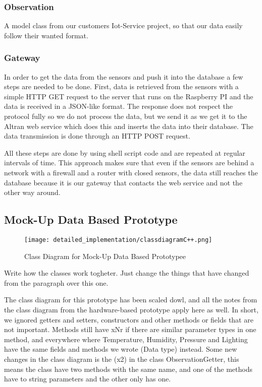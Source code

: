 \documentclass[../document]{subfiles}
\begin{document}
\subsubsection{Observation}
A model class from our customers Iot-Service project, so that our data easily follow their wanted format.

\subsubsection{Gateway}
In order to get the data from the sensors and push it into the database a few steps are needed to be done. First, data is retrieved from the sensors with a simple HTTP GET request to the server that runs on the Raspberry PI and the data is received in a JSON-like format. The response does not respect the protocol fully so we do not process the data, but we send it as we get it to the Altran web service which does this and inserts the data into their database. The data transmission is done through an HTTP POST request. 

All these steps are done by using shell script code and are repeated at regular intervals of time.
This approach makes sure that even if the sensors are behind a network with a firewall and a router with closed sensors, the data still reaches the database because it is our gateway that contacts the web service and not the other way around.

\subsection{Mock-Up Data Based Prototype}

\begin{figure}[H]
\centering
\texttt{[image: detailed\_implementation/classdiagramC++.png]}
\caption{Class Diagram for Mock-Up Data Based Prototypee}
\label{fig:ClassDiagramC++}
\end{figure}

{\color{red}Write how the classes work togheter. Just change the things that have changed from the paragraph over this one.}

The class diagram for this prototype has been scaled dowl, and all the notes from the class diagram from the hardware-based prototype apply here as well. In short, we ignored getters and setters, constructors and other methods or fields that are not important. Methods still have xNr if there are similar parameter types in one method, and everywhere where Temperature, Humidity, Pressure and Lighting have the same fields and methods we wrote (Data type) instead. Some new changes in the class diagram is the (x2) in the class ObservationGetter, this means the class have two methods with the same name, and one of the methods have to string parameters and the other only has one.
\end{document}
